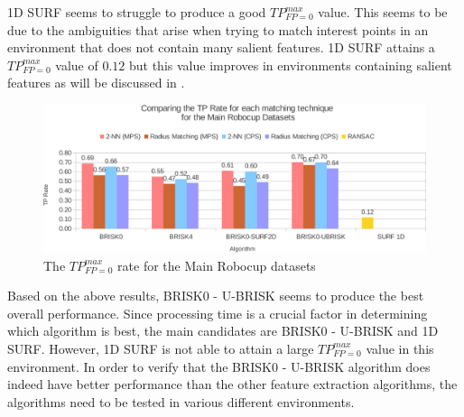 \documentclass{report}
\begin{document}
1D SURF seems to struggle to produce a good $TP_{FP=0}^{max}$ value. This seems to be due to the ambiguities that arise when trying to match interest points in an environment that does not contain many salient features. 1D SURF attains a $TP_{FP=0}^{max}$ value of $0.12$ but this value improves in environments containing salient features as will be discussed in .\\

\begin{figure}
  \centering
    \includegraphics[width=1.0\textwidth]{../Drawings/Graphs/tp_rate_mrb.pdf}
    \caption{The $TP_{FP=0}^{max}$ rate for the Main Robocup datasets} 
    \label{fig:tp_rate_mrd}
\end{figure}

Based on the above results, BRISK0 - U-BRISK seems to produce the best overall performance. Since processing time is a crucial factor in determining which algorithm is best, the main candidates are BRISK0 - U-BRISK and 1D SURF. However, 1D SURF is not able to attain a large $TP_{FP=0}^{max}$ value in this environment. In order to verify that the BRISK0 - U-BRISK algorithm does indeed have better performance than the other feature extraction algorithms, the algorithms need to be tested in various different environments.\\ 

\end{document}
